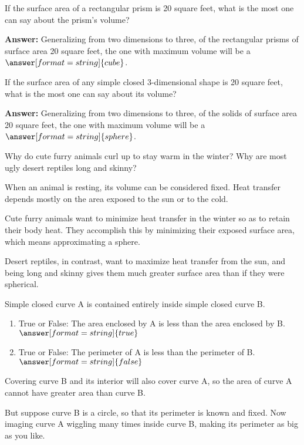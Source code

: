 \documentclass[nooutcomes]{ximera}
\begin{document}
\begin{problem}
If the surface area of a rectangular prism is 20 square feet, what is the most one can say about the prism's volume?  

\textbf{Answer:} Generalizing from two dimensions to three, of the rectangular prisms of surface area 20 square feet, the one with maximum volume will be a $\answer[format=string]{cube}$.

\begin{problem}
If the surface area of any simple closed 3-dimensional shape is 20 square feet, what is the most one can say about its volume? 

\textbf{Answer:} Generalizing from two dimensions to three, of the solids of surface area 20 square feet, the one with maximum volume will be a $\answer[format=string]{sphere}$.
\end{problem}
\end{problem}

\begin{problem}
Why do cute furry animals curl up to stay warm in the winter?  Why are most ugly desert reptiles long and skinny?

\begin{freeResponse}
\end{freeResponse}
\begin{hint}
When an animal is resting, its volume can be considered fixed.  Heat transfer depends mostly on the area exposed to the sun or to the cold.  

Cute furry animals want to minimize heat transfer in the winter so as to retain their body heat.  They accomplish this by minimizing their exposed surface area, which means approximating a sphere. 

Desert reptiles, in contrast, want to maximize heat transfer from the sun, and being long and skinny gives them much greater surface area than if they were spherical.  
\end{hint}
\end{problem}

\begin{problem}Simple closed curve A is contained entirely inside simple closed curve B.  
\begin{enumerate}
\item True or False:  The area enclosed by A is less than the area enclosed by B. 
$\answer[format=string]{true}$
\item True or False:  The perimeter of A is less than the perimeter of B.   
$\answer[format=string]{false}$
\end{enumerate}
\begin{feedback}[correct]
Covering curve B and its interior will also cover curve A, so the area of curve A cannot have greater area than curve B. 

But suppose curve B is a circle, so that its perimeter is known and fixed.  Now imaging curve A wiggling many times inside curve B, making its perimeter as big as you like.  
\end{feedback}
\end{problem}
\end{document}
